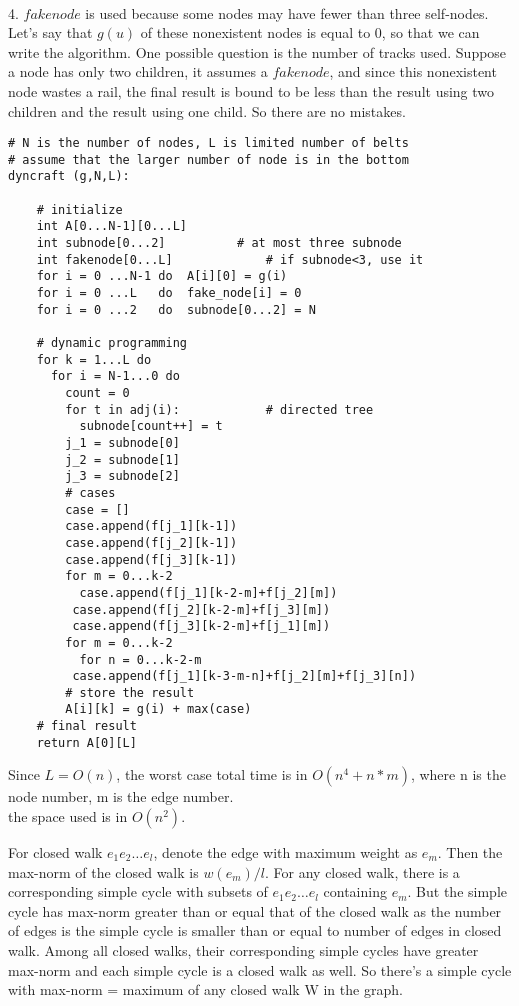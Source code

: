 \documentclass[12pt,a4paper]{article}
\newcommand{\question}[1]{\bigskip\noindent{\textbf{Q{#1} solution}}}
\begin{document}
\\4. $fakenode$ is used because some nodes may have fewer than three self-nodes. Let's say that $g(u)$ of these nonexistent nodes is equal to 0, so that we can write the algorithm. One possible question is the number of tracks used. Suppose a node has only two children, it assumes a $fakenode$, and since this nonexistent node wastes a rail, the final result is bound to be less than the result using two children and the result using one child. So there are no mistakes.\\
\begin{lstlisting}
# N is the number of nodes, L is limited number of belts
# assume that the larger number of node is in the bottom
dyncraft (g,N,L):  

	# initialize
	int A[0...N-1][0...L]
	int subnode[0...2]  		# at most three subnode
	int fakenode[0...L] 			# if subnode<3, use it
	for i = 0 ...N-1 do  A[i][0] = g(i)
	for i = 0 ...L 	 do  fake_node[i] = 0
	for i = 0 ...2 	 do  subnode[0...2] = N
	
	# dynamic programming
	for k = 1...L do
	  for i = N-1...0 do
	    count = 0
	    for t in adj(i):  			# directed tree
	      subnode[count++] = t
	    j_1 = subnode[0]
	    j_2 = subnode[1]
	    j_3 = subnode[2]
	    # cases
	    case = []
	    case.append(f[j_1][k-1])
	    case.append(f[j_2][k-1])
	    case.append(f[j_3][k-1])
	    for m = 0...k-2
	      case.append(f[j_1][k-2-m]+f[j_2][m]) 
		 case.append(f[j_2][k-2-m]+f[j_3][m])
		 case.append(f[j_3][k-2-m]+f[j_1][m])
	    for m = 0...k-2
	      for n = 0...k-2-m
		 case.append(f[j_1][k-3-m-n]+f[j_2][m]+f[j_3][n])
	    # store the result
	    A[i][k] = g(i) + max(case)
	# final result
	return A[0][L]

\end{lstlisting}
Since $L = O(n)$, the worst case total time is in $O(n^4 + n*m)$, where n is the node number, m is the edge number.\\
the space used is in $O(n^2)$.\\


\question{27.A}

For closed walk $e_1e_2\dots e_l$, denote the edge with maximum weight as $e_m$. Then the max-norm of the closed walk is $w(e_m)/l$. For any closed walk, there is a corresponding simple cycle with subsets of $e_1e_2\dots e_l$ containing $e_m$. But the simple cycle has max-norm greater than or equal that of the closed walk as the number of edges is the simple cycle is smaller than or equal to number of edges in closed walk. Among all closed walks, their corresponding simple cycles have greater max-norm and each simple cycle is a closed walk as well. So there's a simple cycle with max-norm = maximum of any closed walk W in the graph.
\end{document}
